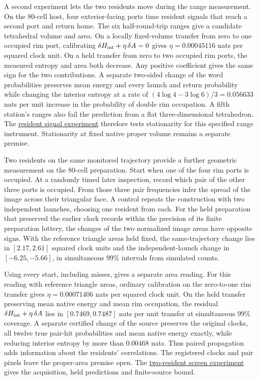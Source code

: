 \documentclass[11pt]{article}
\begin{document}
A second experiment lets the two residents move during the range
measurement. On the 80-cell host, four exterior-facing ports time
resident signals that reach a second port and return home. The six
half-round-trip ranges give a candidate tetrahedral volume and area.
On a locally fixed-volume transfer from zero to one occupied rim port,
calibrating $\delta H_{\rm int}+\eta\,\delta A=0$ gives
$\eta=0.00045116$ nats per squared clock unit. On a held transfer
from zero to two occupied rim ports, the measured entropy and area
both decrease. Any positive coefficient gives the same sign for the
two contributions. A separate two-sided change of the word
probabilities preserves mean energy and every launch and return
probability while changing the interior entropy at a rate of
$(4\log4-3\log6)/3=0.056633$ nats per unit increase in the probability
of double rim occupation. A fifth station's ranges also fail the
prediction from a flat three-dimensional tetrahedron. The
\href{https://github.com/FloatingPragma/observer-patch-holography/tree/main/model/experiments/interval_echo_einstein_station/equilibrium_refinement/area_survey}{resident signal experiment}
therefore tests stationarity for this specified range instrument.
Stationarity at fixed native proper volume remains a separate premise.

Two residents on the same monitored trajectory provide a further
geometric measurement on the 80-cell preparation. Start when one of the
four rim ports is occupied. At a randomly timed later inspection,
record which pair of the other three ports is occupied. From those
three pair frequencies infer the spread of the image across their
triangular face. A control repeats the construction with two independent
launches, choosing one resident from each. For the held preparation
that preserved the earlier clock records within the precision of its finite
preparation lottery, the changes of the two normalized image areas have
opposite signs. With the reference triangle areas held fixed, the
same-trajectory change lies in $[2.17,2.61]$ squared clock units and the
independent-launch change in $[-6.25,-5.66]$, in simultaneous $99\%$
intervals from simulated counts.

Using every start, including misses, gives a separate area reading.
For this reading with reference triangle areas, ordinary calibration on
the zero-to-one rim transfer gives $\eta=0.00071406$ nats per squared
clock unit. On the held transfer preserving mean native energy and
mean rim occupation, the residual $\delta H_{\rm int}+\eta\,\delta A$
lies in $[0.7469,0.7487]$ nats per unit transfer at simultaneous
$99\%$ coverage. A separate certified change of the source preserves
the original clocks, all twelve true pair-hit probabilities and mean
native energy exactly, while reducing interior entropy by more than
$0.00468$ nats. Thus paired propagation adds information about the
residents' correlations. The registered clocks and pair pixels leave
the proper-area premise open. The
\href{https://github.com/FloatingPragma/observer-patch-holography/tree/main/model/experiments/interval_echo_einstein_station/equilibrium_refinement/area_survey/joint_screen}{two-resident screen experiment}
gives the acquisition, held predictions and finite-source bound.
\end{document}

